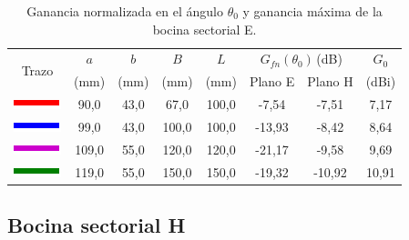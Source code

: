 \begin{table}[H]
\centering
\begin{tabular}{|c|c|c|c|c|c|c|c|}
\hline
\multirow{2}{*}{Trazo} & $a$ & $b$ & $B$ & $L$ & \multicolumn{2}{c|}{$G_{fn}\left(\theta_0\right)\,$(dB)} & $G_0$ \\
\cline{6-7}
& (mm) & (mm) & (mm) & (mm) & Plano E & Plano H & (dBi)\\
\hline
\includegraphics[scale = 1]{Figures/Estudio/linea_tabla_rojo} & 90,0 & 43,0 & 67,0 & 100,0 & -7,54 & -7,51 & 7,17 \\
\hline
\includegraphics[scale = 1]{Figures/Estudio/linea_tabla_azul} & 99,0 & 43,0 & 100,0 & 100,0 & -13,93 & -8,42 & 8,64 \\
\hline
\includegraphics[scale = 1]{Figures/Estudio/linea_tabla_violeta} & 109,0 & 55,0 & 120,0 & 120,0 & -21,17 & -9,58 & 9,69 \\
\hline
\includegraphics[scale = 1]{Figures/Estudio/linea_tabla_verde} & 119,0 & 55,0 & 150,0 & 150,0 & -19,32 & -10,92 & 10,91 \\
\hline
\end{tabular}
\caption{Ganancia normalizada en el ángulo $\theta_0$ y ganancia máxima de la bocina sectorial E.}
\label{tabla_estudio:7}
\end{table}

\subsection{Bocina sectorial H}
\label{subsec_estudio_boci_sech}

